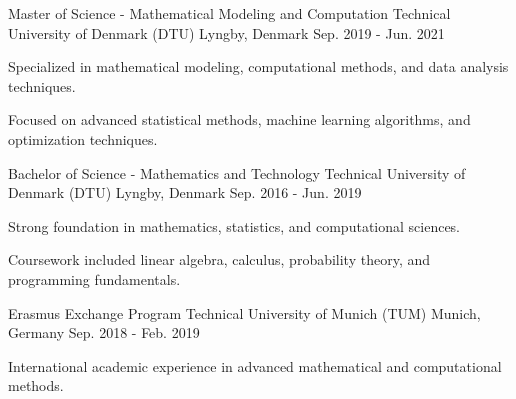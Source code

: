 

\begin{cventries}

  \cventry
    {Master of Science - Mathematical Modeling and Computation} %
    {Technical University of Denmark (DTU)} %
    {Lyngby, Denmark} %
    {Sep. 2019 - Jun. 2021} %
    {
      \begin{cvitems} %
        \item {Specialized in mathematical modeling, computational methods, and data analysis techniques.}
        \item {Focused on advanced statistical methods, machine learning algorithms, and optimization techniques.}
      \end{cvitems}
    }

  \cventry
    {Bachelor of Science - Mathematics and Technology} %
    {Technical University of Denmark (DTU)} %
    {Lyngby, Denmark} %
    {Sep. 2016 - Jun. 2019} %
    {
      \begin{cvitems} %
        \item {Strong foundation in mathematics, statistics, and computational sciences.}
        \item {Coursework included linear algebra, calculus, probability theory, and programming fundamentals.}
      \end{cvitems}
    }

  \cventry
    {Erasmus Exchange Program} %
    {Technical University of Munich (TUM)} %
    {Munich, Germany} %
    {Sep. 2018 - Feb. 2019} %
    {
      \begin{cvitems} %
        \item {International academic experience in advanced mathematical and computational methods.}
      \end{cvitems}
    }

\end{cventries}

